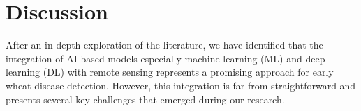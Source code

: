 


\section{Discussion}

After an in-depth exploration of the literature, we have identified that the integration of AI-based models especially machine learning (ML) and deep learning (DL) with remote sensing represents a promising approach for early wheat disease detection. However, this integration is far from straightforward and presents several key challenges that emerged during our research.

